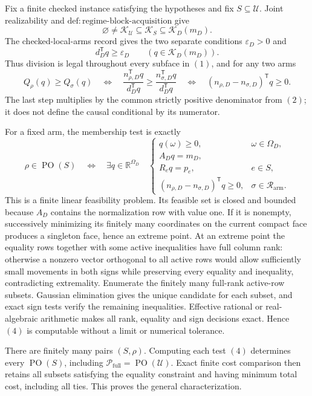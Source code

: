 Fix a finite checked instance satisfying the hypotheses and fix
\(S\subseteq\mathcal U\).  Joint realizability and
\(\mathrm{def:regime\text{-}block\text{-}acquisition}\) give
\[
\varnothing\ne\mathcal K_{\mathcal U}
\subseteq\mathcal K_S\subseteq\mathcal K_D(m_D).
\tag{1}
\]
The checked-local-arms record gives the two separate conditions
\(\varepsilon_D>0\) and
\[
d_D^{\mathsf T}q\geq\varepsilon_D
\qquad(q\in\mathcal K_D(m_D)).
\tag{2}
\]
Thus division is legal throughout every subface in \((1)\), and for any two arms
\[
Q_\rho(q)\geq Q_\sigma(q)
\quad\Longleftrightarrow\quad
\frac{n_{\rho,D}^{\mathsf T}q}{d_D^{\mathsf T}q}
\geq
\frac{n_{\sigma,D}^{\mathsf T}q}{d_D^{\mathsf T}q}
\quad\Longleftrightarrow\quad
(n_{\rho,D}-n_{\sigma,D})^{\mathsf T}q\geq0.
\tag{3}
\]
The last step multiplies by the common strictly positive denominator from \((2)\);
it does not define the causal conditional by its numerator.

For a fixed arm, the membership test is exactly
\[
\rho\in\operatorname{PO}(S)
\quad\Longleftrightarrow\quad
\exists q\in\mathbb R^{\Omega_D}\quad
\begin{cases}
q(\omega)\geq0,&\omega\in\Omega_D,\\
A_Dq=m_D,\\
R_eq=p_e,&e\in S,\\
(n_{\rho,D}-n_{\sigma,D})^{\mathsf T}q\geq0,
&\sigma\in\mathcal R_{\mathrm{arm}}.
\end{cases}
\tag{4}
\]
This is a finite linear feasibility problem.  Its feasible set is closed and bounded
because \(A_D\) contains the normalization row with value one.  If it is nonempty,
successively minimizing its finitely many coordinates on the current compact face
produces a singleton face, hence an extreme point.  At an extreme point the equality
rows together with some active inequalities have full column rank: otherwise a
nonzero vector orthogonal to all active rows would allow sufficiently small
movements in both signs while preserving every equality and inequality, contradicting
extremality.  Enumerate the finitely many full-rank active-row subsets.  Gaussian
elimination gives the unique candidate for each subset, and exact sign tests verify
the remaining inequalities.  Effective rational or real-algebraic arithmetic makes
all rank, equality and sign decisions exact.  Hence \((4)\) is computable without a
limit or numerical tolerance.

There are finitely many pairs \((S,\rho)\).  Computing each test \((4)\) determines
every \(\operatorname{PO}(S)\), including
\(\mathcal P_{\mathrm{full}}=\operatorname{PO}(\mathcal U)\).  Exact finite cost
comparison then retains all subsets satisfying the equality constraint and having
minimum total cost, including all ties.  This proves the general characterization.


